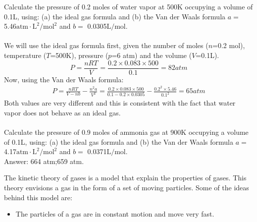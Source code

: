 \documentclass[main.tex]{subfiles}
\begin{document}
\begin{description}
		




\begin{example} %
Calculate the pressure of 0.2 moles of water vapor at 500K occupying a volume of 0.1L, using: (a) the ideal gas formula and (b) the Van der Waals formula $a=$ 5.46$\text{atm}\cdot \text{L}^2/\text{mol}^{2}$ and $b=$ 0.0305$\text{L}/\text{mol}$.\\
\\
We will use the ideal gas formula first, given the number of moles ($n$=0.2 mol), temperature ($T$=500K), pressure ($p$=6 atm) and the volume ($V$=0.1L).
\begin{equation*}
P=\frac{nRT}{V}=\frac{0.2\times 0.083\times 500}{0.1}=82atm   
\end{equation*}
Now, using the Van der Waals formula:
\begin{equation*}\begin{split}
P=\frac{nRT}{V-nb}-\frac{n^2a}{V^2}= \frac{0.2\times 0.083\times 500}{0.1-0.2\times 0.0305}-\frac{0.2^2\times 5.46}{0.1^2}=65atm 
\end{split}\end{equation*}
Both values are very different and this is consistent with the fact that water vapor does not behave as an ideal gas.
\\
\faDiamond\ \\
Calculate the pressure of 0.9 moles of ammonia gas at 900K occupying a volume of 0.1L, using: (a) the ideal gas formula and (b) the Van der Waals formula $a=$ 4.17$\text{atm}\cdot \text{L}^2/\text{mol}^{2}$ and $b=$ 0.0371$\text{L}/\text{mol}$.\\
\flushright Answer: 664 atm;659 atm.
\end{example}%
\item[\docfilehook{Kinetic theory of gases}{Kinetic theory of gases}] 
The kinetic theory of gases is a model that explain the properties of gases. This theory envisions a gas in the form of a set of moving particles. Some of the ideas behind this model are: 
\begin{itemize}
\item  The particles of a gas are in constant motion and move very fast.

\end{itemize}
\end{description}
\end{document}
